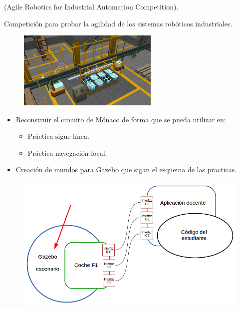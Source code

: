 \documentclass[notes,slidesec,a4]{seminar}
\begin{document}
\begin{hslide}
	\begin{center}(Agile Robotics for Industrial Automation Competition). \end{center}
	Competición para probar la agilidad de los sistemas robóticos industriales.
	\begin{center}
		\begin{figure}
			\includegraphics[width=0.6\textwidth]{ariac01.png}
		\end{figure}
	\end{center}
\end{hslide}


\begin{hslide}
	\begin{itemize}
		\item Reconstruir el circuito de Mónaco de forma que se pueda utilizar en:
		\begin{itemize}
			\item Práctica sigue línea.
			\item Práctica navegación local.
		\end{itemize}
		\item Creación de mundos para Gazebo que sigan el esquema de las practicas.
	\end{itemize}
\end{hslide}

\begin{hslide}
	\begin{center}
		\begin{figure}
			\includegraphics[width=\textwidth]{graficof1.png}
		\end{figure}
	\end{center}
\end{hslide}
\end{document}
